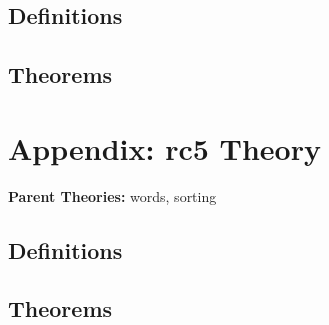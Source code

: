 \documentclass{article}
\begin{document}

\subsection{Definitions}

\HOLdesXXpropDefinitions

\subsection{Theorems}

\HOLdesXXpropTheorems

\section{Appendix: rc5 Theory}
\begin{flushleft}
\textbf{Parent Theories:} words, sorting
\end{flushleft}


\subsection{Definitions}

\HOLrcFiveDefinitions

\subsection{Theorems}

\HOLrcFiveTheorems
\end{document}
